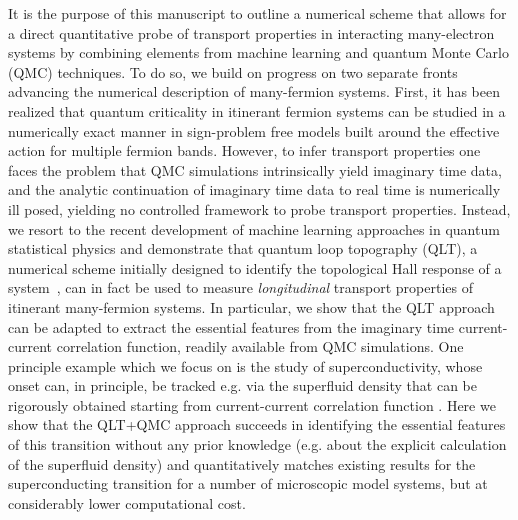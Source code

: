 \documentclass[amsmath,amssymb, aps, prx, longbibliography, twocolumn]{revtex4-1}
\begin{document}
It is the purpose of this manuscript to outline a numerical scheme that 
allows for a direct quantitative probe of transport properties in interacting many-electron systems
by combining elements from machine learning and quantum Monte Carlo (QMC)
techniques. 
To do so, we build on progress on two separate fronts advancing the numerical description of many-fermion systems.
First, it has been realized that quantum criticality in itinerant fermion systems can be studied in a numerically exact manner 
in sign-problem free models 
\cite{Berg2012,Schattner2016a,Gerlach2017,Xu2017a,Lederer2017,Li2016,Li2017,Jiang2017,Berg2018}
built around the effective action for multiple fermion bands. 
However, to infer transport properties one faces the problem that QMC simulations intrinsically yield imaginary time data, 
and the analytic continuation of imaginary time data to real time is numerically ill posed, yielding no controlled framework
to probe transport properties. 
Instead, we resort to the recent development of machine learning approaches in quantum statistical physics and demonstrate that quantum loop topography (QLT), a numerical scheme initially designed to identify the topological Hall response of a system~\cite{qlt2016}, can in fact be used to measure {\em longitudinal} transport properties of itinerant many-fermion systems.
In particular, we show that the QLT approach can be adapted to extract the essential features from the imaginary time current-current correlation function, readily available from QMC simulations. One principle example which we focus on is the study of superconductivity, whose onset can, in principle, be tracked e.g. via the superfluid density that can be rigorously obtained starting from current-current correlation function \cite{Scalapino1992,Scalapino1993}. 
Here we show that the QLT+QMC approach succeeds in identifying the essential features of this transition without any prior knowledge (e.g. about the explicit calculation of the superfluid density)
and quantitatively matches existing results for the superconducting transition for a number of microscopic model systems,
but at considerably lower computational cost.
\end{document}
